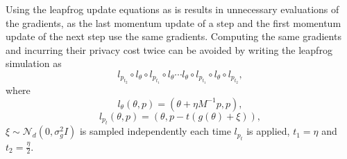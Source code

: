 \documentclass[english,twoside,openright]{HYgraduMLDS}
\newcommand{\caln}{{\mathcal{N}}}
\begin{document}
Using the leapfrog update equations as is results in unnecessary evaluations
of the gradients, as the last momentum update of a step and the first momentum
update of the next step use the same gradients. Computing the same gradients
and incurring their privacy cost
twice can be avoided by writing the leapfrog simulation as
\[
  l_{p_{t_{2}}}\circ l_{\theta}\circ l_{p_{t_{1}}}\circ l_{\theta}\dotsb
  l_{\theta}\circ l_{p_{t_{1}}}\circ l_{\theta}\circ l_{p_{t_{2}}},
\]
where
\[
  l_{\theta}(\theta, p) = (\theta + \eta M^{-1}p, p),
\]
\[
  l_{p_{t}}(\theta, p) = (\theta, p - t(g(\theta) + \xi)),
\]
\(\xi \sim \caln_{d}(0, \sigma_{g}^2I)\) is sampled independently each time
\(l_{p_{t}}\) is applied, \(t_{1} = \eta\) and \(t_{2} = \frac{\eta}{2}\).


%
%
\end{document}
